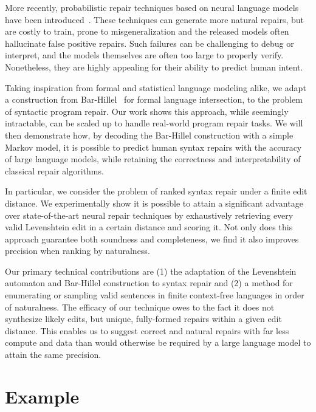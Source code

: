 \documentclass[runningheads]{llncs}
\begin{document}
  More recently, probabilistic repair techniques based on neural language models have been introduced~\cite{allamanis2021self,yasunaga2021break,sakkas2022seq2parse}. These techniques can generate more natural repairs, but are costly to train, prone to misgeneralization and the released models often hallucinate false positive repairs. Such failures can be challenging to debug or interpret, and the models themselves are often too large to properly verify. Nonetheless, they are highly appealing for their ability to predict human intent.

  Taking inspiration from formal and statistical language modeling alike, we adapt a construction from Bar-Hillel~\cite{bar1961formal} for formal language intersection, to the problem of syntactic program repair. Our work shows this approach, while seemingly intractable, can be scaled up to handle real-world program repair tasks. We will then demonstrate how, by decoding the Bar-Hillel construction with a simple Markov model, it is possible to predict human syntax repairs with the accuracy of large language models, while retaining the correctness and interpretability of classical repair algorithms.

  In particular, we consider the problem of ranked syntax repair under a finite edit distance. We experimentally show it is possible to attain a significant advantage over state-of-the-art neural repair techniques by exhaustively retrieving every valid Levenshtein edit in a certain distance and scoring it. Not only does this approach guarantee both soundness and completeness, we find it also improves precision when ranking by naturalness.

  Our primary technical contributions are (1) the adaptation of the Levenshtein automaton and Bar-Hillel construction to syntax repair and (2) a method for enumerating or sampling valid sentences in finite context-free languages in order of naturalness. The efficacy of our technique owes to the fact it does not synthesize likely edits, but unique, fully-formed repairs within a given edit distance. This enables us to suggest correct and natural repairs with far less compute and data than would otherwise be required by a large language model to attain the same precision.

  \section{Example}\label{sec:example}
\end{document}
